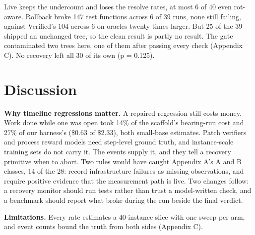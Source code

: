 \documentclass{article}
\begin{document}
Live keeps the undercount and loses the resolve rates, at most 6 of 40 even rot-aware. Rollback broke 147 test functions across 6 of 39 runs, none still failing, against Verified's 104 across 6 on oracles twenty times larger. But 25 of the 39 shipped an unchanged tree, so the clean result is partly no result. The gate contaminated two trees here, one of them after passing every check (Appendix C). No recovery left all 30 of its own (p = 0.125).

\section{Discussion}

\textbf{Why timeline regressions matter.} A repaired regression still costs money. Work done while one was open took 14\% of the scaffold's bearing-run cost and 27\% of our harness's (\$0.63 of \$2.33), both small-base estimates. Patch verifiers \cite{ref24} and process reward models \cite{ref25} need step-level ground truth, and instance-scale training sets \cite{ref32,ref33} do not carry it. The events supply it, and they tell a recovery primitive \cite{ref41} when to abort. Two rules would have caught Appendix A's A and B classes, 14 of the 28: record infrastructure failures as missing observations, and require positive evidence that the measurement path is live. Two changes follow: a recovery monitor should run tests rather than trust a model-written check, and a benchmark should report what broke during the run beside the final verdict.

\textbf{Limitations.} Every rate estimates a 40-instance slice with one sweep per arm, and event counts bound the truth from both sides (Appendix C).
\end{document}

